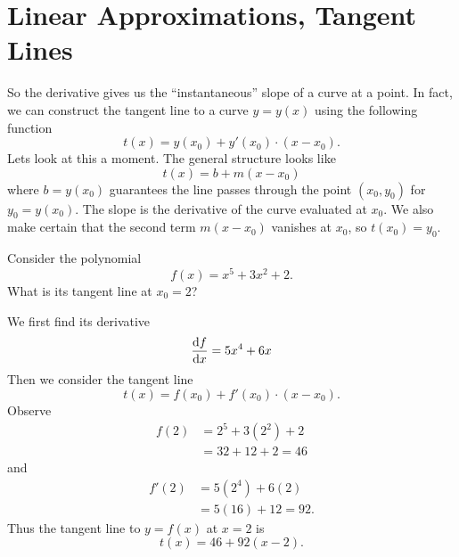 \section{Linear Approximations, Tangent Lines}
So the derivative gives us the ``instantaneous'' slope of a curve
at a point. In fact, we can construct the tangent line to a curve
$y=y(x)$ using the following function
\begin{equation}
t(x) = y(x_{0})+y'(x_{0})\cdot(x-x_{0}).
\end{equation}
Lets look at this a moment. The general structure looks like
\begin{equation}
t(x) = b + m(x-x_{0})
\end{equation}
where $b=y(x_{0})$ guarantees the line passes through the point
$(x_{0},y_{0})$ for $y_{0}=y(x_{0})$. The slope is the derivative
of the curve evaluated at $x_{0}$. We also make certain that the
second term $m(x-x_{0})$ vanishes at $x_{0}$, so
$t(x_{0})=y_{0}$.

\begin{ex}
Consider the polynomial
\begin{equation}
f(x) = x^{5}+3x^{2}+2.
\end{equation}
What is its tangent line at $x_{0}=2$? 

We first find its derivative
\begin{equation}
\frac{\mathrm{d} f}{\mathrm{d} x}= 5x^{4} + 6x
\end{equation}
Then we consider the tangent line
\begin{equation}
t(x) = f(x_{0}) + f'(x_{0})\cdot(x-x_{0}).
\end{equation}
Observe
\begin{equation}
\begin{split}
f(2) &= 2^{5} + 3(2^{2})+2\\
&= 32 + 12 + 2 = 46
\end{split}
\end{equation}
and
\begin{equation}
\begin{split}
f'(2) &= 5(2^{4}) + 6(2)\\
&=5(16) + 12 = 92.
\end{split}
\end{equation}
Thus the tangent line to $y=f(x)$ at $x=2$ is
\begin{equation}
t(x) = 46 + 92(x-2).
\end{equation}
\end{ex}

